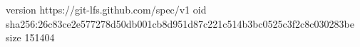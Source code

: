 version https://git-lfs.github.com/spec/v1
oid sha256:26c83ce2e577278d50db001cb8d951d87c221c514b3bc0525c3f2c8c030283be
size 151404
